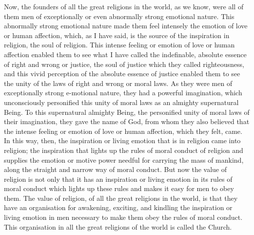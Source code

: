 Now, the founders of all the great religions in the world, as we know, were all of them men of exceptionally or even abnormally strong emotional nature.
This abnormally strong emotional nature made them feel intensely the emotion of love or human affection, which, as I have said, is the source of the inspiration in religion, the soul of religion.
This intense feeling or emotion of love or human affection enabled them to see what I have called the indefinable, absolute essence of right and wrong or justice, the soul of justice which they called righteousness, and this vivid perception of the absolute essence of justice enabled them to see the unity of the laws of right and wrong or moral laws.
As they were men of exceptionally strong e-motional nature, they had a powerful imagination, which unconsciously personified this unity of moral laws as an almighty supernatural Being.
To this supernatural almighty Being, the personified unity of moral laws of their imagination, they gave the name of God, from whom they also believed that the intense feeling or emotion of love or human affection, which they felt, came.
In this way, then, the inspiration or living emotion that is in religion came into religion; the inspiration that lights up the rules of moral conduct of religion and supplies the emotion or motive power needful for carrying the mass of mankind, along the straight and narrow way of moral conduct.
But now the value of religion is not only that it has an inspiration or living emotion in its rules of moral conduct which lights up these rules and makes it easy for men to obey them.
The value of religion, of all the great religions in the world, is that they have an organisation for awakening, exciting, and kindling the inspiration or living emotion in men necessary to make them obey the rules of moral conduct.
This organisation in all the great religions of the world is called the Church.

